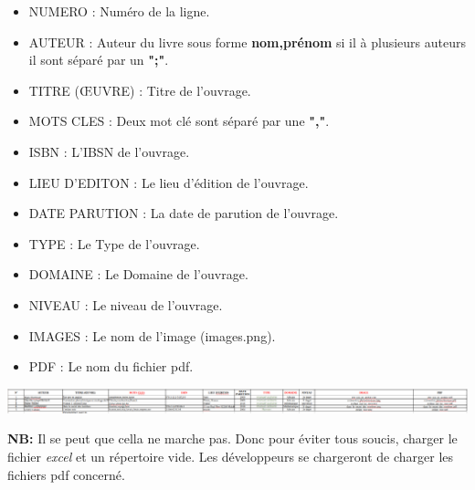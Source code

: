 \documentclass[12pt,a4paper]{article}
\begin{document}
\begin{itemize}
\begin{itemize}
\item NUMERO : Numéro de la ligne.
\item AUTEUR : Auteur du livre sous forme \textbf{nom,prénom} si il à plusieurs auteurs il
sont séparé par un \textbf{";"}.
\item TITRE (ŒUVRE) : Titre de l'ouvrage.
\item MOTS CLES : Deux mot clé sont séparé par une \textbf{","}.
\item ISBN : L'IBSN de l'ouvrage.
\item LIEU D'EDITON : Le lieu d'édition de l'ouvrage.
\item DATE PARUTION : La date de parution de l'ouvrage.
\item TYPE : Le Type de l'ouvrage.
\item DOMAINE : Le Domaine de l'ouvrage.
\item NIVEAU : Le niveau de l'ouvrage.
\item IMAGES : Le nom de l'image (images.png).
\item PDF : Le nom du fichier pdf.
\end{itemize}

\begin{center}
\includegraphics[scale=0.25]{img/fromat_excel_num.png}
\end{center}

\textbf{NB:} Il se peut que cella ne marche pas. Donc pour éviter tous soucis, charger le fichier
\textit{excel} et un répertoire vide. Les développeurs se chargeront de charger les fichiers pdf concerné.

\end{itemize} 
\end{document}
